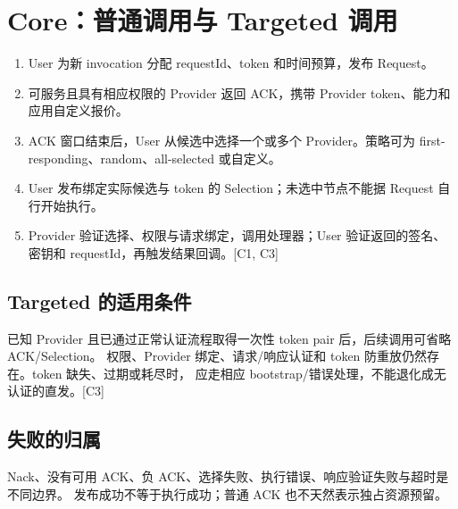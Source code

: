 \newpage

\section{Core：普通调用与 Targeted 调用}
\begin{enumerate}
\item User 为新 invocation 分配 requestId、token 和时间预算，发布 Request。
\item 可服务且具有相应权限的 Provider 返回 ACK，携带 Provider token、能力和应用自定义报价。
\item ACK 窗口结束后，User 从候选中选择一个或多个 Provider。策略可为 first-responding、random、all-selected 或自定义。
\item User 发布绑定实际候选与 token 的 Selection；未选中节点不能据 Request 自行开始执行。
\item Provider 验证选择、权限与请求绑定，调用处理器；User 验证返回的签名、密钥和 requestId，再触发结果回调。[C1, C3]
\end{enumerate}

\begin{center}
\end{center}

\subsection{Targeted 的适用条件}
已知 Provider 且已通过正常认证流程取得一次性 token pair 后，后续调用可省略 ACK/Selection。
权限、Provider 绑定、请求/响应认证和 token 防重放仍然存在。token 缺失、过期或耗尽时，
应走相应 bootstrap/错误处理，不能退化成无认证的直发。[C3]

\subsection{失败的归属}
Nack、没有可用 ACK、负 ACK、选择失败、执行错误、响应验证失败与超时是不同边界。
发布成功不等于执行成功；普通 ACK 也不天然表示独占资源预留。


